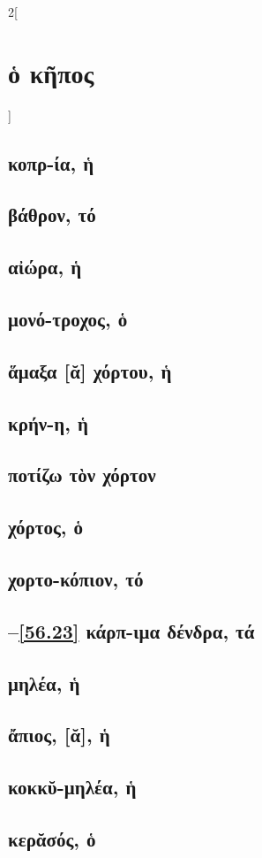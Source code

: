 \documentclass{book}
\begin{document}
\begin{multicols}{2}[\section{ὁ κῆπος}]
\subsection{κοπρ-ία, ἡ}
\subsection{βάθρον, τό}
\subsection{αἰώρα, ἡ}
\subsection{μονό-τροχος, ὁ}
\subsection{ἅμαξα [ᾰ] χόρτου, ἡ}
\subsection{κρήν-η, ἡ}
\subsection{ποτίζω τὸν χόρτον}
\subsection{χόρτος, ὁ}
\subsection{χορτο-κόπιον, τό}
\subsection{\protect\hspace{-2ex}--\ref{56.23} κάρπ-ιμα δένδρα, τά}
 \setcounter{subsection}{19}
\subsection{μηλέα, ἡ}
\subsection{ἄπιος, [ᾰ], ἡ}
\subsection{κοκκῠ-μηλέα, ἡ}
\subsection{κερᾰσός, ὁ}
\label{56.23}  
~
\end{multicols}
\end{document}
